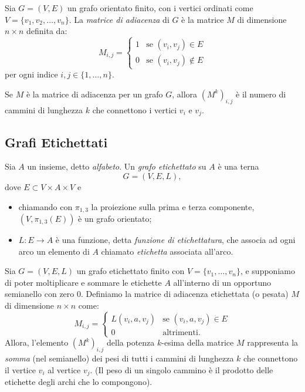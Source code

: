 \begin{defi}
Sia $G = (V, E)$ un grafo orientato finito, con i vertici ordinati come $V = \{v_1, v_2, \dots, v_n\}$. La \emph{matrice di adiacenza} di $G$ è la matrice $M$ di dimensione $n \times n$ definita da:
\[M_{i,j} = \begin{cases}  1 & \text{se } (v_i, v_j) \in E \\  0 & \text{se } (v_i, v_j) \notin E  \end{cases}\]
per ogni indice $i,j \in \{1, \dots, n\}$.
\end{defi}

\begin{prop}
Se $M$ è la matrice di adiacenza per un grafo $G$, allora $(M^k)_{i,j}$ è il numero di cammini di lunghezza $k$ che connettono i vertici $v_i$ e $v_j$.
\end{prop}

\subsection{Grafi Etichettati}

\begin{defi}\label{def:grafo-etichettato}
Sia $A$ un insieme, detto \emph{alfabeto}. Un \emph{grafo etichettato} su $A$ è una terna
\[G=(V,E,L),\]
dove $E \subset V \times A \times V$ e
\begin{itemize}
    \item chiamando con $\pi_{1,3}$ la proiezione sulla prima e terza componente, $(V,\pi_{1,3}(E))$ è un grafo orientato;
    \item $L:E\to A$ è una funzione, detta \emph{funzione di etichettatura}, che associa ad ogni arco un elemento di $A$ chiamato \emph{etichetta} associata all'arco.
\end{itemize}
\end{defi}

\begin{prop}
Sia $G=(V,E,L)$ un grafo etichettato finito con $V = \{v_1, \dots, v_n\}$, e supponiamo di poter moltiplicare e sommare le etichette $A$ all'interno di un opportuno semianello con zero $0$. 
Definiamo la matrice di adiacenza etichettata (o pesata) $M$ di dimensione $n \times n$ come:
\[M_{i,j} = \begin{cases} L(v_i, a, v_j) & \text{se } (v_i, a, v_j) \in E \\ 0 & \text{altrimenti.} \end{cases}\]
Allora, l'elemento $(M^k)_{i,j}$ della potenza $k$-esima della matrice $M$ rappresenta la \emph{somma} (nel semianello) dei pesi di tutti i cammini di lunghezza $k$ che connettono il vertice $v_i$ al vertice $v_j$. (Il peso di un singolo cammino è il prodotto delle etichette degli archi che lo compongono).
\end{prop}

